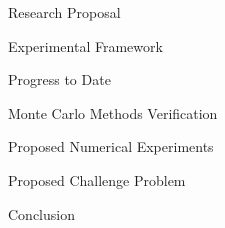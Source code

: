 \documentclass{beamer}
\begin{document}
\begin{frame}{Research Proposal}

\end{frame}

\begin{frame}{Experimental Framework}

\end{frame}

\begin{frame}{Progress to Date}

\end{frame}

\begin{frame}{Monte Carlo Methods Verification}

\end{frame}

\begin{frame}{Proposed Numerical Experiments}

\end{frame}

\begin{frame}{Proposed Challenge Problem}

\end{frame}

\begin{frame}{Conclusion}

\end{frame}

\end{document}
